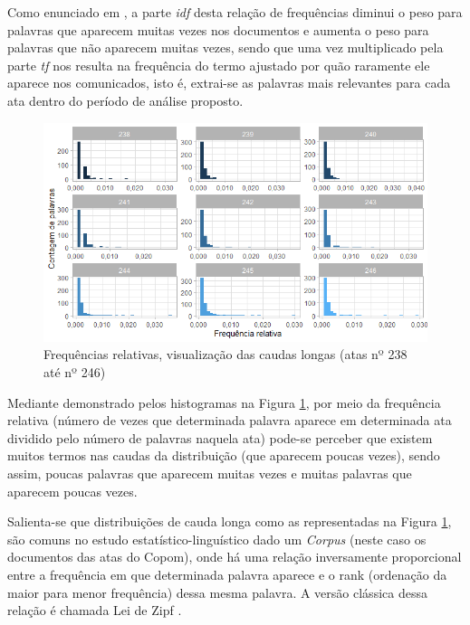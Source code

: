 Como enunciado em , a parte \textit{idf} desta relação de frequências diminui o peso para palavras que aparecem muitas vezes nos documentos e aumenta o peso para palavras que não aparecem muitas vezes, sendo que uma vez multiplicado pela parte \textit{tf} nos resulta na frequência do termo ajustado por quão raramente ele aparece nos comunicados, isto é, extrai-se as palavras mais relevantes para cada ata dentro do período de análise proposto.

\begin{figure}
	\centering
	\caption{Frequências relativas, visualização das caudas longas (atas nº 238 até nº 246)} \label{figure:relative_freq_histograms}
	\includegraphics[scale = 0.75]{figuras/histogram_freq_words.png}
\end{figure}

Mediante demonstrado pelos histogramas na Figura \ref{figure:relative_freq_histograms}, por meio da frequência relativa (número de vezes que determinada palavra aparece em determinada ata dividido pelo número de palavras naquela ata) pode-se perceber que existem muitos termos nas caudas da distribuição (que aparecem poucas vezes), sendo assim, poucas palavras que aparecem muitas vezes e muitas palavras que aparecem poucas vezes.

Salienta-se que distribuições de cauda longa como as representadas na Figura \ref{figure:relative_freq_histograms}, são comuns no estudo estatístico-linguístico dado um \textit{Corpus} (neste caso os documentos das atas do Copom), onde há uma relação inversamente proporcional entre a frequência em que determinada palavra aparece e o rank (ordenação da maior para menor frequência) dessa mesma palavra. A versão clássica dessa relação é chamada Lei de Zipf \cite{piantadosi2014zipf}.

